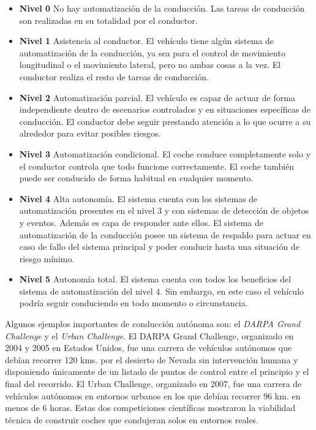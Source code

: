 \begin{itemize}
    \item \textbf{Nivel 0} No hay automatización de la conducción. Las tareas de conducción son realizadas en su totalidad por el conductor.
    \item \textbf{Nivel 1} Asistencia al conductor. El vehículo tiene algún sistema de automatización de la conducción, ya sea para el control de movimiento longitudinal o el movimiento lateral, pero no ambas cosas a la vez. El conductor realiza el resto de tareas de conducción.
    \item \textbf{Nivel 2} Automatización parcial. El vehículo es capaz de actuar de forma independiente dentro de escenarios controlados y en situaciones específicas de conducción. El conductor debe seguir prestando atención a lo que ocurre a su alrededor para evitar posibles riesgos.
    \item \textbf{Nivel 3} Automatización condicional. El coche conduce completamente solo y el conductor controla que todo funcione correctamente. El coche también puede ser conducido de forma habitual en cualquier momento.
    \item \textbf{Nivel 4} Alta autonomía. El sistema cuenta con los sistemas de automatización presentes en el nivel 3 y con sistemas de detección de objetos y eventos. Además es capa de responder ante ellos. El sistema de automatización de la conducción posee un sistema de respaldo para actuar en caso de fallo del sistema principal y poder conducir hasta una situación de riesgo mínimo.
    \item \textbf{Nivel 5} Autonomía total. El sistema cuenta con todos los beneficios del sistema de automatización del nivel 4. Sin embargo, en este caso el vehículo podría seguir conduciendo en todo momento o circunstancia.
\end{itemize}

Algunos ejemplos importantes de conducción autónoma son: el \textit{DARPA Grand Challenge} y el \textit{Urban Challenge}. El DARPA Grand Challenge, organizado en 2004 y 2005 en Estados Unidos, fue una carrera de vehículos autónomos que debían recorrer 120 kms. por el desierto de Nevada sin intervención humana y disponiendo únicamente de un listado de puntos de control entre el principio y el final del recorrido. El Urban Challenge, organizado en 2007, fue una carrera de vehículos autónomos en entornos urbanos en los que debían recorrer 96 km. en menos de 6 horas. Estas dos competiciones científicas mostraron la viabilidad técnica de construir coches que condujeran solos en entornos reales.

